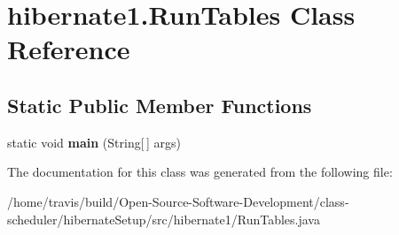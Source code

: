\hypertarget{classhibernate1_1_1_run_tables}{\section{hibernate1.\-Run\-Tables Class Reference}
\label{classhibernate1_1_1_run_tables}
}
\subsection*{Static Public Member Functions}
\begin{DoxyCompactItemize}
\item 
\hypertarget{classhibernate1_1_1_run_tables_a2a5479797664047fda2ab3da9c216d8e}{static void {\bfseries main} (String\mbox{[}$\,$\mbox{]} args)}\label{classhibernate1_1_1_run_tables_a2a5479797664047fda2ab3da9c216d8e}

\end{DoxyCompactItemize}


The documentation for this class was generated from the following file\-:\begin{DoxyCompactItemize}
\item 
/home/travis/build/\-Open-\/\-Source-\/\-Software-\/\-Development/class-\/scheduler/hibernate\-Setup/src/hibernate1/Run\-Tables.\-java\end{DoxyCompactItemize}
